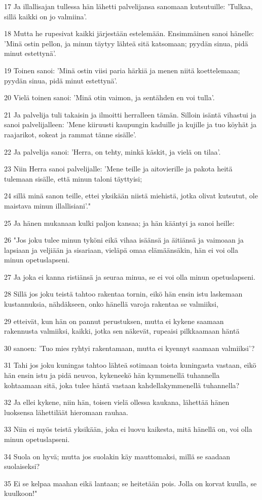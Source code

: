 \par 17 Ja illallisajan tullessa hän lähetti palvelijansa sanomaan kutsutuille: 'Tulkaa, sillä kaikki on jo valmiina'.
\par 18 Mutta he rupesivat kaikki järjestään estelemään. Ensimmäinen sanoi hänelle: 'Minä ostin pellon, ja minun täytyy lähteä sitä katsomaan; pyydän sinua, pidä minut estettynä'.
\par 19 Toinen sanoi: 'Minä ostin viisi paria härkiä ja menen niitä koettelemaan; pyydän sinua, pidä minut estettynä'.
\par 20 Vielä toinen sanoi: 'Minä otin vaimon, ja sentähden en voi tulla'.
\par 21 Ja palvelija tuli takaisin ja ilmoitti herralleen tämän. Silloin isäntä vihastui ja sanoi palvelijalleen: 'Mene kiiruusti kaupungin kaduille ja kujille ja tuo köyhät ja raajarikot, sokeat ja rammat tänne sisälle'.
\par 22 Ja palvelija sanoi: 'Herra, on tehty, minkä käskit, ja vielä on tilaa'.
\par 23 Niin Herra sanoi palvelijalle: 'Mene teille ja aitovierille ja pakota heitä tulemaan sisälle, että minun taloni täyttyisi;
\par 24 sillä minä sanon teille, ettei yksikään niistä miehistä, jotka olivat kutsutut, ole maistava minun illallisiani'."
\par 25 Ja hänen mukanaan kulki paljon kansaa; ja hän kääntyi ja sanoi heille:
\par 26 "Jos joku tulee minun tyköni eikä vihaa isäänsä ja äitiänsä ja vaimoaan ja lapsiaan ja veljiään ja sisariaan, vieläpä omaa elämäänsäkin, hän ei voi olla minun opetuslapseni.
\par 27 Ja joka ei kanna ristiänsä ja seuraa minua, se ei voi olla minun opetuslapseni.
\par 28 Sillä jos joku teistä tahtoo rakentaa tornin, eikö hän ensin istu laskemaan kustannuksia, nähdäkseen, onko hänellä varoja rakentaa se valmiiksi,
\par 29 etteivät, kun hän on pannut perustuksen, mutta ei kykene saamaan rakennusta valmiiksi, kaikki, jotka sen näkevät, rupeaisi pilkkaamaan häntä
\par 30 sanoen: 'Tuo mies ryhtyi rakentamaan, mutta ei kyennyt saamaan valmiiksi'?
\par 31 Tahi jos joku kuningas tahtoo lähteä sotimaan toista kuningasta vastaan, eikö hän ensin istu ja pidä neuvoa, kykeneekö hän kymmenellä tuhannella kohtaamaan sitä, joka tulee häntä vastaan kahdellakymmenellä tuhannella?
\par 32 Ja ellei kykene, niin hän, toisen vielä ollessa kaukana, lähettää hänen luoksensa lähettiläät hieromaan rauhaa.
\par 33 Niin ei myös teistä yksikään, joka ei luovu kaikesta, mitä hänellä on, voi olla minun opetuslapseni.
\par 34 Suola on hyvä; mutta jos suolakin käy mauttomaksi, millä se saadaan suolaiseksi?
\par 35 Ei se kelpaa maahan eikä lantaan; se heitetään pois. Jolla on korvat kuulla, se kuulkoon!"

